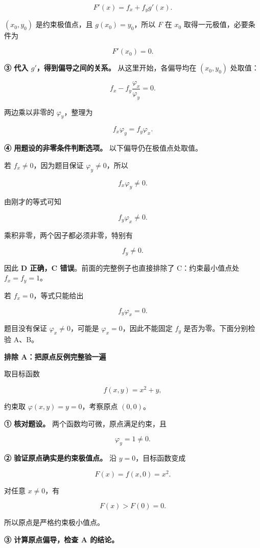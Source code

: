 \documentclass[UTF8,11pt,fontset=windows]{ctexart}
\begin{document}
$$
F'(x)=f_x+f_y g'(x).
$$

$(x_0,y_0)$ 是约束极值点，且 $g(x_0)=y_0$，所以 $F$ 在 $x_0$ 取得一元极值，必要条件为

$$
F'(x_0)=0.
$$

\textbf{③ 代入 $g'$，得到偏导之间的关系。} 从这里开始，各偏导均在 $(x_0,y_0)$ 处取值：

$$
f_x-f_y\frac{\varphi_x}{\varphi_y}=0.
$$

两边乘以非零的 $\varphi_y$，整理为

$$
\boxed{f_x\varphi_y=f_y\varphi_x}.
$$

\textbf{④ 用题设的非零条件判断选项。} 以下偏导仍在极值点处取值。

若 $f_x\ne0$，因为题目保证 $\varphi_y\ne0$，所以

$$
f_x\varphi_y\ne0.
$$

由刚才的等式可知

$$
f_y\varphi_x\ne0.
$$

乘积非零，两个因子都必须非零，特别有

$$
\boxed{f_y\ne0}.
$$

因此 \textbf{D 正确，C 错误}。前面的完整例子也直接排除了 C：约束最小值点处 $f_x=f_y=1$。

若 $f_x=0$，等式只能给出

$$
f_y\varphi_x=0.
$$

题目没有保证 $\varphi_x\ne0$，可能是 $\varphi_x=0$，因此不能固定 $f_y$ 是否为零。下面分别检验 A、B。

{\bfseries 排除 A：把原点反例完整验一遍\par}

取目标函数

$$
f(x,y)=x^2+y,
$$

约束取 $\varphi(x,y)=y=0$，考察原点 $(0,0)$。

\textbf{① 核对题设。} 两个函数均可微，原点满足约束，且

$$
\varphi_y=1\ne0.
$$

\textbf{② 验证原点确实是约束极值点。} 沿 $y=0$，目标函数变成

$$
F(x)=f(x,0)=x^2.
$$

对任意 $x\ne0$，有

$$
F(x)>F(0)=0.
$$

所以原点是严格约束极小值点。

\textbf{③ 计算原点偏导，检查 A 的结论。}
\end{document}
